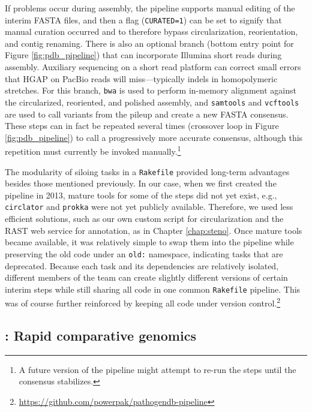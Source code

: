 If problems occur during assembly, the pipeline supports manual editing of the interim FASTA files, and then a flag (\texttt{CURATED=1}) can be set to signify that manual curation occurred and to therefore bypass circularization, reorientation, and contig renaming. There is also an optional branch (bottom entry point for Figure \ref{fig:pdb_pipeline}) that can incorporate Illumina short reads during assembly. Auxiliary sequencing on a short read platform can correct small errors that HGAP on PacBio reads will miss—typically indels in homopolymeric stretches. For this branch, \texttt{bwa}\autocite{Li2010b} is used to perform in-memory alignment against the circularized, reoriented, and polished assembly, and \texttt{samtools}\autocite{Li2009b} and \texttt{vcftools}\autocite{Danecek2011a} are used to call variants from the pileup and create a new FASTA consensus. These steps can in fact be repeated several times (crossover loop in Figure \ref{fig:pdb_pipeline}) to call a progressively more accurate consensus, although this repetition must currently be invoked manually.\footnote{A future version of the pipeline might attempt to re-run the steps until the consensus stabilizes.}

The modularity of siloing tasks in a \texttt{Rakefile} provided long-term advantages besides those mentioned previously. In our case, when we first created the pipeline in 2013, mature tools for some of the steps did not yet exist, e.g., \texttt{circlator} and \texttt{prokka} were not yet publicly available. Therefore, we used less efficient solutions, such as our own custom script for circularization and the RAST web service\autocite{Aziz2008} for annotation, as in Chapter \ref{chap:steno}. Once mature tools became available, it was relatively simple to swap them into the pipeline while preserving the old code under an \texttt{old:} namespace, indicating tasks that are deprecated. Because each task and its dependencies are relatively isolated, different members of the team can create slightly different versions of certain interim steps while still sharing all code in one common \texttt{Rakefile} pipeline. This was of course further reinforced by keeping all code under version control.\footnote{\url{https://github.com/powerpak/pathogendb-pipeline}}

\subsection{\pathogendbcomparison: Rapid comparative genomics}

